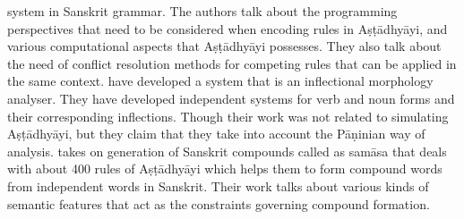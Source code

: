 \documentclass[11pt]{article}
\begin{document}
system in Sanskrit grammar. The authors talk about the programming perspectives that need to be
considered when encoding rules in Aṣṭādhyāyi, and various computational aspects that
Aṣṭādhyāyi possesses. They also talk about the need of conflict resolution methods for competing
rules that can be applied in the same context.  have developed a system that is an
inflectional morphology analyser. They have developed independent systems for verb and noun
forms and their corresponding inflections. Though their work was not related to simulating  Aṣṭādhyāyi, but they claim that they take into account the Pāṇinian way of analysis.    takes on generation of
Sanskrit compounds called as samāsa that deals with about 400 rules of Aṣṭādhyāyi which helps them
to form compound words from independent words in Sanskrit. Their work talks about various kinds of semantic features that act as the constraints governing compound formation.
\end{document}
